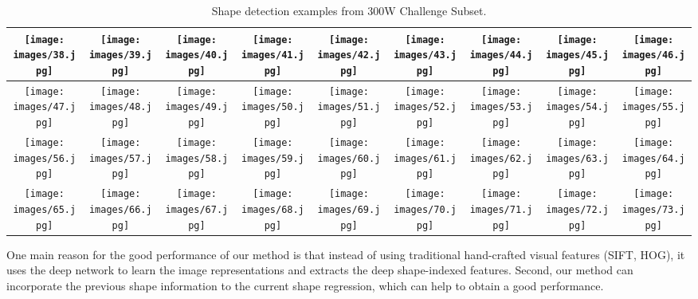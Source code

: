 \documentclass[journal]{IEEEtran}
\begin{document}
\begin{table*}[t]
 \centering \caption{Shape detection examples from 300W Challenge Subset.}
\begin{tabular}{|c|c|c|c|c|c|c|c|c|}
\hline
\texttt{[image: images/38.jpg]}&
\texttt{[image: images/39.jpg]}&
\texttt{[image: images/40.jpg]} &
\texttt{[image: images/41.jpg]} &
\texttt{[image: images/42.jpg]} &
\texttt{[image: images/43.jpg]}&
\texttt{[image: images/44.jpg]}&
\texttt{[image: images/45.jpg]} &
\texttt{[image: images/46.jpg]} \\
\hline
\texttt{[image: images/47.jpg]} &
\texttt{[image: images/48.jpg]}&
\texttt{[image: images/49.jpg]}&
\texttt{[image: images/50.jpg]} &
\texttt{[image: images/51.jpg]} &
\texttt{[image: images/52.jpg]} &
\texttt{[image: images/53.jpg]}&
\texttt{[image: images/54.jpg]}&
\texttt{[image: images/55.jpg]} \\
\hline
\texttt{[image: images/56.jpg]} &
\texttt{[image: images/57.jpg]} &
\texttt{[image: images/58.jpg]}&
\texttt{[image: images/59.jpg]}&
\texttt{[image: images/60.jpg]} &
\texttt{[image: images/61.jpg]} &
\texttt{[image: images/62.jpg]} &
\texttt{[image: images/63.jpg]}&
\texttt{[image: images/64.jpg]} \\
\hline
\texttt{[image: images/65.jpg]} &
\texttt{[image: images/66.jpg]} &
\texttt{[image: images/67.jpg]}&
\texttt{[image: images/68.jpg]}&
\texttt{[image: images/69.jpg]} &
\texttt{[image: images/70.jpg]} &
\texttt{[image: images/71.jpg]} &
\texttt{[image: images/72.jpg]}&
\texttt{[image: images/73.jpg]} \\
\hline
\end{tabular}
 \label{image_examples}
\end{table*}

One main reason for the good performance of our method is that instead of using traditional hand-crafted visual features (SIFT, HOG), it uses the deep network to learn the image representations and extracts the deep shape-indexed features.
Second, our method can incorporate the previous shape information to the current shape regression, which can help to obtain a good performance.
\end{document}

